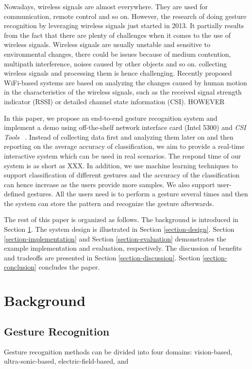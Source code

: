\documentclass[conference]{IEEEtran}
\begin{document}
Nowadays, wireless signals are almost everywhere. They are used for communication, remote control and so on. However, the research of doing gesture recognition by leveraging wireless signals just started in 2013. It partially results from the fact that there are plenty of challenges when it comes to the use of wireless signals. 
Wireless signals are usually unstable and sensitive to environmental changes, there could be issues because of medium contention, multipath interference, noises caused by other objects and so on.
collecting wireless signals and processing them is hence challenging.
Recently proposed WiFi-based systems are based on analyzing the changes caused by human motion in the characteristics of the wireless signals, such as the received signal strength indicator (RSSI) or detailed channel state information (CSI). HOWEVER

In this paper, we propose an end-to-end gesture recognition system and implement a demo using off-the-shelf network interface card (Intel 5300) and \emph{CSI Tools} ~\cite{halperin2011tool}. 
Instead of collecting data first and analyzing them later on and then reporting on the average accuracy of classification, we aim to provide a real-time interactive system which can be used in real scenarios. 
The respond time of our system is as short as XXX. 
In addition, we use machine learning techniques to support classification of different gestures and the accuracy of the classification can hence increase as the users provide more samples.
We also support user-defined gestures. All the users need is to perform a gesture several times and then the system can store the pattern and recognize the gesture afterwards.

The rest of this paper is organized as follows.  The background is introduced in Section \ref{section-background}. The system design is illustrated in Section \ref{section-design}. Section \ref{section-implementation} and Section \ref{section-evaluation} demonstrates the example implementation and evaluation, respectively. The discussion of benefits and tradeoffs are presented in Section \ref{section-discussion}. Section \ref{section-conclusion} concludes the paper.

\section{Background} \label{section-background}
\subsection{Gesture Recognition}
Gesture recognition methods can be divided into four domains: vision-based, ultra-sonic-based, electric-field-based, and 
\end{document}
